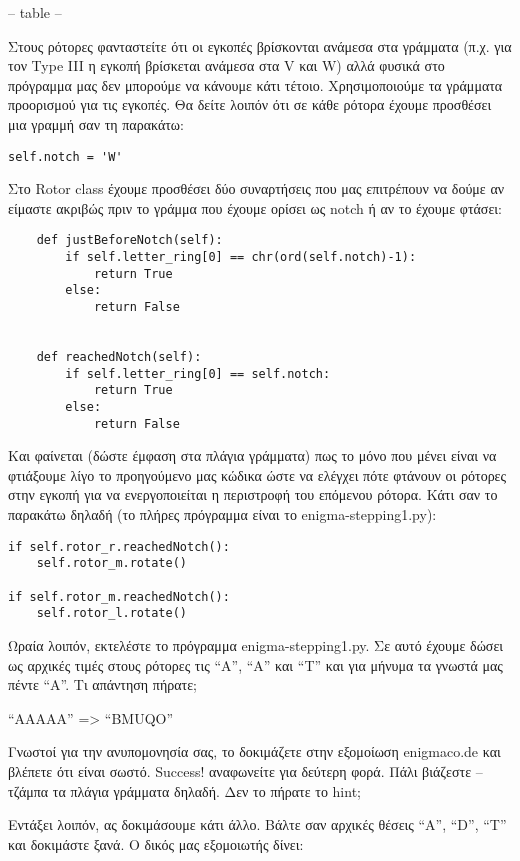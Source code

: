 \documentclass[a4paper,twoside,12pt]{article}
\begin{document}
-- table --

Στους ρότορες φανταστείτε ότι οι εγκοπές βρίσκονται ανάμεσα στα γράμματα (π.χ. για τον Type III η εγκοπή βρίσκεται ανάμεσα στα V και W) αλλά φυσικά στο πρόγραμμα μας δεν μπορούμε να κάνουμε κάτι τέτοιο. Χρησιμοποιούμε τα γράμματα προορισμού για τις εγκοπές. Θα δείτε λοιπόν ότι σε κάθε ρότορα έχουμε προσθέσει μια γραμμή σαν τη παρακάτω:

\begin{verbatim}
self.notch = 'W'
\end{verbatim}

Στο Rotor class έχουμε προσθέσει δύο συναρτήσεις που μας επιτρέπουν να δούμε αν είμαστε ακριβώς πριν το γράμμα που έχουμε ορίσει ως notch ή αν το έχουμε φτάσει:

\begin{verbatim}
    def justBeforeNotch(self):
        if self.letter_ring[0] == chr(ord(self.notch)-1):
            return True
        else:
            return False


    def reachedNotch(self):
        if self.letter_ring[0] == self.notch:
            return True
        else:
            return False
\end{verbatim}


Και φαίνεται (δώστε έμφαση στα πλάγια γράμματα) πως το μόνο που μένει είναι να φτιάξουμε λίγο το προηγούμενο μας κώδικα ώστε να ελέγχει πότε φτάνουν οι ρότορες στην εγκοπή για να ενεργοποιείται η περιστροφή του επόμενου ρότορα. Κάτι σαν το παρακάτω δηλαδή (το πλήρες πρόγραμμα είναι το enigma-stepping1.py):

\begin{verbatim}
if self.rotor_r.reachedNotch():
    self.rotor_m.rotate()

if self.rotor_m.reachedNotch():
    self.rotor_l.rotate()
\end{verbatim}

Ωραία λοιπόν, εκτελέστε το πρόγραμμα enigma-stepping1.py. Σε αυτό έχουμε δώσει ως αρχικές τιμές στους ρότορες τις “A”, “A” και “Τ” και για μήνυμα τα γνωστά μας πέντε “Α”. Τι απάντηση πήρατε;

“AAAAA” => “BMUQO”

Γνωστοί για την ανυπομονησία σας, το δοκιμάζετε στην εξομοίωση enigmaco.de και βλέπετε ότι είναι σωστό. Success! αναφωνείτε για δεύτερη φορά. Πάλι βιάζεστε – τζάμπα τα πλάγια γράμματα δηλαδή. Δεν το πήρατε το hint;

Εντάξει λοιπόν, ας δοκιμάσουμε κάτι άλλο. Βάλτε σαν αρχικές θέσεις “A”, “D”, “T” και δοκιμάστε ξανά. Ο δικός μας εξομοιωτής δίνει:
\end{document}
